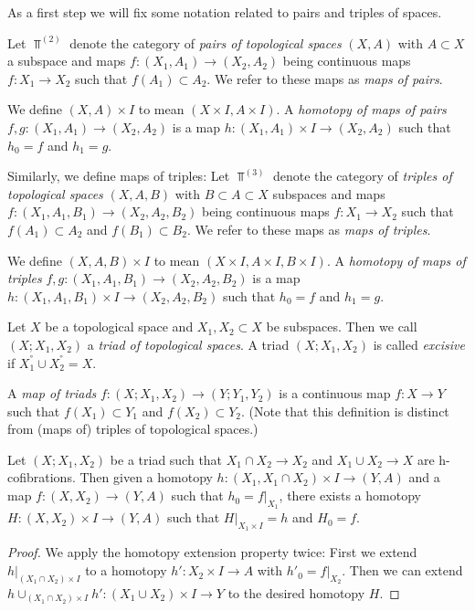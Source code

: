 As a first step we will fix some notation related to pairs and triples of spaces. 
\begin{definition}
    Let $\Top^{(2)}$ denote the category of \emph{pairs of topological spaces} $(X,A)$ with $A\subset X$ a subspace and maps $f\colon(X_1,A_1)\to (X_2,A_2)$ being continuous maps $f\colon X_1\to X_2$ such that $f(A_1)\subset A_2$.
    We refer to these maps as \emph{maps of pairs}.
    
    We define $(X,A)\times I$ to mean $(X\times I,A\times I)$.
    A \emph{homotopy of maps of pairs} $f,g\colon(X_1,A_1)\to (X_2,A_2)$ is a map $h\colon(X_1,A_1)\times I\to (X_2,A_2)$ such that $h_0=f$ and $h_1=g$.

    Similarly, we define maps of triples:
    Let $\Top^{(3)}$ denote the category of \emph{triples of topological spaces} $(X,A,B)$ with $B\subset A\subset X$ subspaces and maps $f\colon(X_1,A_1,B_1)\to (X_2,A_2,B_2)$ being continuous maps $f\colon X_1\to X_2$ such that $f(A_1)\subset A_2$ and $f(B_1)\subset B_2$.
    We refer to these maps as \emph{maps of triples}.
    
    We define $(X,A,B)\times I$ to mean $(X\times I,A\times I, B\times I)$.
    A \emph{homotopy of maps of triples} $f,g\colon(X_1,A_1,B_1)\to (X_2,A_2,B_2)$ is a map $h\colon(X_1,A_1,B_1)\times I\to (X_2,A_2,B_2)$ such that $h_0=f$ and $h_1=g$.
\end{definition}
\begin{definition}[Triad]
    Let $X$ be a topological space and $X_1,X_2\subset X$ be subspaces.
    Then we call $(X;X_1,X_2)$ a \emph{triad of topological spaces}.
    A triad $(X;X_1,X_2)$ is called \emph{excisive} if $X_1^°\cup X_2^°=X$.

    A \emph{map of triads} $f\colon (X;X_1,X_2)\to (Y;Y_1,Y_2)$ is a continuous map $f\colon X\to Y$ such that $f(X_1)\subset Y_1$ and $f(X_2)\subset Y_2$.
    (Note that this definition is distinct from (maps of) triples of topological spaces.)
\end{definition}
\begin{lemma}\label{lem:rHEP}
    Let $(X;X_1,X_2)$ be a triad such that $X_1\cap X_2\to X_2$ and $X_1\cup X_2\to X$ are h-cofibrations. 
    Then given a homotopy $h\colon(X_1,X_1\cap X_2)\times I\to(Y,A)$ and a map $f\colon(X,X_2)\to(Y,A)$ such that $h_0=f|_{X_1}$, there exists a homotopy $H\colon(X,X_2)\times I\to(Y,A)$ such that $H|_{X_1\times I}=h$ and $H_0=f$.
    \begin{proof}
        We apply the homotopy extension property twice: First we extend $h|_{\left(X_1\cap X_2\right)\times I}$ to a homotopy $h'\colon X_2\times I\to A$ with $h'_0=f|_{X_2}$.
        Then we can extend $h\cup_{(X_1\cap X_2)\times I} h'\colon \left(X_1\cup X_2\right)\times I\to Y$ to the desired homotopy $H$.
    \end{proof}
\end{lemma}
